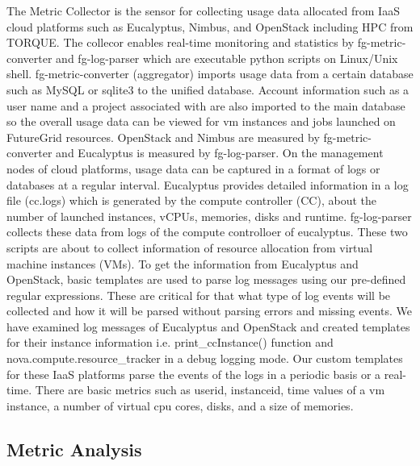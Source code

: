 \documentclass{sig-alternate}
\begin{document}
The Metric Collector is the sensor for collecting usage data allocated from IaaS cloud platforms such as Eucalyptus, Nimbus, and OpenStack including HPC from TORQUE. The collecor enables real-time monitoring and statistics by fg-metric-converter and fg-log-parser which are executable python scripts on Linux/Unix shell. fg-metric-converter (aggregator) imports usage data from a certain database such as MySQL or sqlite3 to the unified database. Account information such as a user name and a project associated with are also imported to the main database so the overall usage data can be viewed for vm instances and jobs launched on FutureGrid resources. OpenStack and Nimbus are measured by fg-metric-converter and Eucalyptus is measured by fg-log-parser. On the management nodes of cloud platforms, usage data can be captured in a format of logs or databases at a regular interval. Eucalyptus provides detailed information in a log file (cc.logs) which is generated by the compute controller (CC), about the number of launched instances, vCPUs, memories, disks and runtime. fg-log-parser collects these data from logs of the compute controlloer of eucalyptus. These two scripts are about to collect information of resource allocation from virtual machine instances (VMs). To get the information from Eucalyptus and OpenStack, basic templates are used to parse log messages using our pre-defined regular expressions. These are critical for that what type of log events will be collected and how it will be parsed without parsing errors and missing events. We have examined log messages of Eucalyptus and OpenStack and created templates for their instance information i.e. print\_ccInstance() function and nova.compute.resource\_tracker in a debug logging mode. Our custom templates for these IaaS platforms parse the events of the logs in a periodic basis or a real-time. There are basic metrics such as userid, instanceid, time values of a vm instance, a number of virtual cpu cores, disks, and a size of memories.

\subsection{Metric Analysis}
\end{document}
